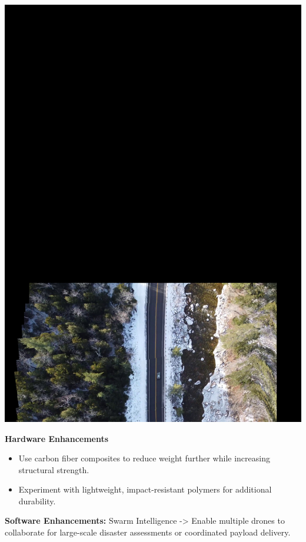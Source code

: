 \documentclass[12pt]{report}
\begin{document}
      \begin{minipage}{0.3\textwidth}
        \centering
        \includegraphics[width=\linewidth]{road.mp4.jpg}
    \end{minipage}%
    
    \vspace{0.5cm}

    \noindent \textbf{Hardware Enhancements}
    \begin{itemize}
      \item Use carbon fiber composites to reduce weight further while increasing structural strength.
      \item Experiment with lightweight, impact-resistant polymers for additional durability.
    \end{itemize}
    \noindent \textbf{Software Enhancements:} Swarm Intelligence -> Enable multiple drones to collaborate for large-scale disaster assessments or coordinated payload delivery. \\ 
\end{document}
